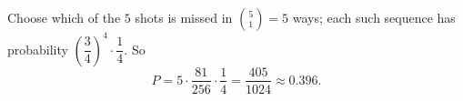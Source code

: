 Choose which of the $5$ shots is missed in $\binom51=5$ ways; each such sequence has probability $\left(\dfrac{3}{4}\right)^4\cdot\dfrac{1}{4}$. So
\[
P=5\cdot\dfrac{81}{256}\cdot\dfrac{1}{4}=\boxed{\dfrac{405}{1024}}\approx0.396 .
\]

